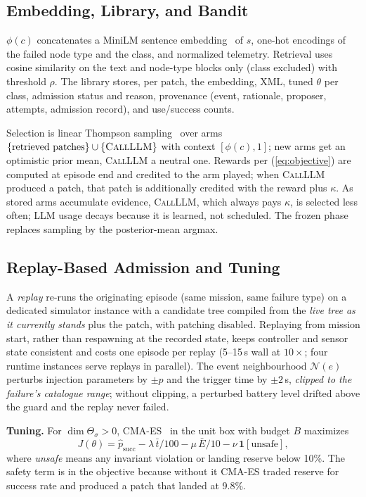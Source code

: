\documentclass[conference]{IEEEtran}
\begin{document}
\subsection{Embedding, Library, and Bandit}
\label{sec:bandit}
$\phi(c)$ concatenates a MiniLM sentence embedding~\cite{reimers2019sbert} of $s$, one-hot encodings of the failed node type and the class, and normalized telemetry. Retrieval uses cosine similarity on the text and node-type blocks only (class excluded) with threshold $\rho$. The library stores, per patch, the embedding, XML, tuned $\theta$ per class, admission status and reason, provenance (event, rationale, proposer, attempts, admission record), and use/success counts.

Selection is linear Thompson sampling~\cite{agrawal2013ts} over arms $\{\text{retrieved patches}\}\cup\{\textsc{CallLLM}\}$ with context $[\phi(c),1]$; new arms get an optimistic prior mean, \textsc{CallLLM} a neutral one. Rewards per (\ref{eq:objective}) are computed at episode end and credited to the arm played; when \textsc{CallLLM} produced a patch, that patch is additionally credited with the reward plus $\kappa$. As stored arms accumulate evidence, \textsc{CallLLM}, which always pays $\kappa$, is selected less often; LLM usage decays because it is learned, not scheduled. The frozen phase replaces sampling by the posterior-mean argmax.

\subsection{Replay-Based Admission and Tuning}
\label{sec:admission}
A \emph{replay} re-runs the originating episode (same mission, same failure type) on a dedicated simulator instance with a candidate tree compiled from the \emph{live tree as it currently stands} plus the patch, with patching disabled. Replaying from mission start, rather than respawning at the recorded state, keeps controller and sensor state consistent and costs one episode per replay (5--15\,s wall at $10\times$; four runtime instances serve replays in parallel). The event neighbourhood $\mathcal{N}(e)$ perturbs injection parameters by $\pm p$ and the trigger time by $\pm 2$\,s, \emph{clipped to the failure's catalogue range}; without clipping, a perturbed battery level drifted above the guard and the replay never failed.

\textbf{Tuning.} For $\dim\Theta_\sigma>0$, CMA-ES~\cite{hansen2001cmaes} in the unit box with budget $B$ maximizes
\begin{equation}
J(\theta) = \hat{p}_{\mathrm{succ}} - \lambda\,\bar{t}/100 - \mu\,\bar{E}/10 - \nu\,\mathbf{1}[\text{unsafe}],
\label{eq:J}
\end{equation}
where \emph{unsafe} means any invariant violation or landing reserve below 10\%. The safety term is in the objective because without it CMA-ES traded reserve for success rate and produced a patch that landed at 9.8\%.
\end{document}
